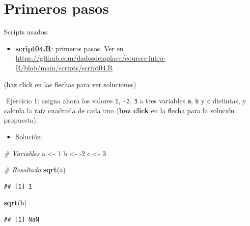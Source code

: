 \documentclass[11pt,]{book}
\newenvironment{Shaded}{\begin{snugshade}}{\end{snugshade}}
\newcommand{\CommentTok}[1]{\textcolor[rgb]{0.37,0.37,0.37}{\textit{#1}}}
\newcommand{\DecValTok}[1]{\textcolor[rgb]{0.06,0.06,0.06}{#1}}
\newcommand{\KeywordTok}[1]{\textcolor[rgb]{0.27,0.27,0.27}{\textbf{#1}}}
\newcommand{\NormalTok}[1]{#1}
\newcommand{\StringTok}[1]{\textcolor[rgb]{0.5,0.5,0.5}{#1}}
\providecommand{\tightlist}{%
  \setlength{\itemsep}{0pt}\setlength{\parskip}{0pt}}
\begin{document}
\hypertarget{primeros-pasos}{%
\section*{Primeros pasos}\label{primeros-pasos}}


\begin{blackbox}

Scripts usados:

\begin{itemize}
\tightlist
\item
  \href{https://github.com/dadosdelaplace/courses-intro-R/blob/main/scripts/script04.R}{\textbf{script04.R}}: primeros pasos. Ver en \url{https://github.com/dadosdelaplace/courses-intro-R/blob/main/scripts/script04.R}
\end{itemize}


\end{blackbox}

(haz click en las flechas para ver soluciones)

📝Ejercicio 1: asigna ahora los valores \texttt{1}, \texttt{-2}, \texttt{3} a tres variables \texttt{a}, \texttt{b} y \texttt{c} distintas, y calcula la raíz cuadrada de cada uno (\textbf{haz click} en la flecha para la solución propuesta).

\begin{itemize}
\tightlist
\item
  Solución:
\end{itemize}

\begin{Shaded}
\begin{Highlighting}[]
\CommentTok{# Variables}
\NormalTok{a <-}\StringTok{ }\DecValTok{1}
\NormalTok{b <-}\StringTok{ }\DecValTok{-2}
\NormalTok{c <-}\StringTok{ }\DecValTok{3}

\CommentTok{# Resultado}
\KeywordTok{sqrt}\NormalTok{(a)}
\end{Highlighting}
\end{Shaded}

\begin{verbatim}
## [1] 1
\end{verbatim}

\begin{Shaded}
\begin{Highlighting}[]
\KeywordTok{sqrt}\NormalTok{(b)}
\end{Highlighting}
\end{Shaded}

\begin{verbatim}
## [1] NaN
\end{verbatim}
\end{document}
